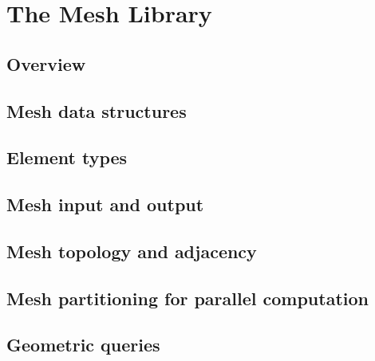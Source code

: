 \chapter{The Mesh Library}
\label{ch:mesh}

\section{Overview}
\label{sec:mesh:overview}


\section{Mesh data structures}
\label{sec:mesh:data}


\section{Element types}
\label{sec:mesh:elements}


\section{Mesh input and output}
\label{sec:mesh:io}


\section{Mesh topology and adjacency}
\label{sec:mesh:topology}


\section{Mesh partitioning for parallel computation}
\label{sec:mesh:partitioning}


\section{Geometric queries}
\label{sec:mesh:queries}

